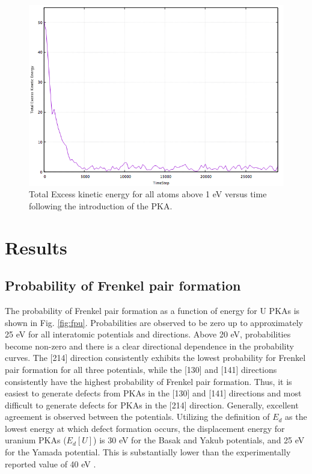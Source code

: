\documentclass[8pt]{article}   	%
\begin{document}
\begin{figure}[H]
\centering
	\includegraphics[width=0.6\linewidth]{ETN.png}
	\caption{Total Excess kinetic energy for all atoms above 1 eV versus time following the introduction of the PKA.}
	\label{fig:KE}
\end{figure}

\section{Results}

\subsection{Probability of Frenkel pair formation}

\hspace{5mm}

The probability of Frenkel pair formation as a function of energy for U PKAs is shown in Fig. \ref{fig:fpu}. Probabilities are observed to be zero up to approximately 25 eV for all interatomic potentials and directions. Above 20 eV, probabilities become non-zero and there is a clear directional dependence in the probability curves. The [214] direction consistently exhibits the lowest probability for Frenkel pair formation for all three potentials, while the [130] and [141] directions consistently have the highest probability of Frenkel pair formation. Thus, it is easiest to generate defects from PKAs in the [130] and [141] directions and most difficult to generate defects for PKAs in the [214] direction. Generally, excellent agreement is observed between the potentials. Utilizing the definition of $E_d$ as the lowest energy at which defect formation occurs, the displacement energy for uranium PKAs ($E_d [U]$) is 30 eV for the Basak and Yakub potentials, and 25 eV for the Yamada potential. This is substantially lower than the experimentally reported value of 40 eV \cite{soullard1977,soullard1985}.
\end{document}
